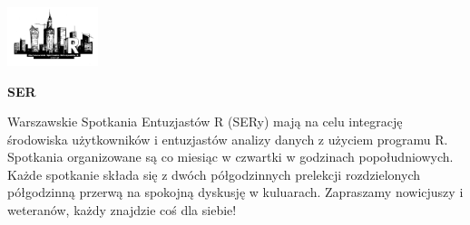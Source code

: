 \documentclass[\main/boa.tex]{subfiles}
\begin{document}
	
	\begin{minipage}[t]{0.915\textwidth}
		\center     
		\includegraphics[width=100px]{img/logos.bw/ser.png} 
	\end{minipage}
	
	\Large \textbf {SER}
	
	
	\vskip 0.3cm
	\normalsize 
	Warszawskie Spotkania Entuzjastów R (SERy) mają na celu integrację środowiska użytkowników i entuzjastów analizy danych z użyciem programu R. Spotkania organizowane są co miesiąc w czwartki w godzinach popołudniowych. Każde spotkanie składa się z dwóch półgodzinnych prelekcji rozdzielonych półgodzinną przerwą na spokojną dyskusję w kuluarach. Zapraszamy nowicjuszy i weteranów, każdy znajdzie coś dla siebie!
	
\end{document}
